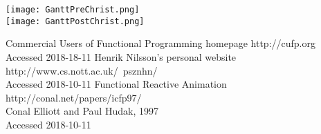 \documentclass[10pt]{article}
\begin{document}
\begin{center}
\texttt{[image: GanttPreChrist.png]}\\
\texttt{[image: GanttPostChrist.png]}\\
\end{center}


\begin{thebibliography}{0}
    Commercial Users of Functional Programming homepage
    http://cufp.org\\
    Accessed 2018-18-11
    Henrik Nilsson's personal website\\
    http://www.cs.nott.ac.uk/~psznhn/\\
    Accessed 2018-10-11
    Functional Reactive Animation\\
    http://conal.net/papers/icfp97/\\
    Conal Elliott and Paul Hudak, 1997\\
    Accessed 2018-10-11
\end{thebibliography}
\end{document}

